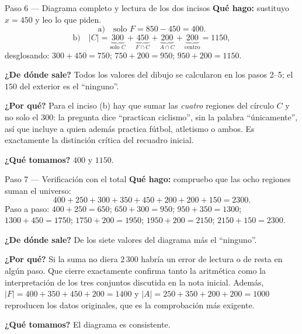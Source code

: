 \documentclass[11pt]{article}
\begin{document}
\begin{paso}{Paso 6 --- Diagrama completo y lectura de los dos incisos}
\textbf{Qué hago:} sustituyo $x=450$ y leo lo que piden.
\[
\text{a)}\quad \text{solo }F = 850-450 = 400 .
\]
\[
\text{b)}\quad |C| = \underbrace{300}_{\text{solo }C}+\underbrace{450}_{F\cap C}+\underbrace{200}_{A\cap C}
+\underbrace{200}_{\text{centro}} = 1150,
\]
desglosando: $300+450=750$; $750+200=950$; $950+200=1150$.

\begin{center}
\end{center}

\textbf{¿De dónde sale?} Todos los valores del dibujo se calcularon en los pasos 2--5; el $150$ del
exterior es el ``ninguno''.

\textbf{¿Por qué?} Para el inciso (b) hay que sumar las \emph{cuatro} regiones del círculo $C$ y no solo
el $300$: la pregunta dice ``practican ciclismo'', sin la palabra ``únicamente'', así que incluye a quien
además practica fútbol, atletismo o ambos. Es exactamente la distinción crítica del recuadro inicial.

\textbf{¿Qué tomamos?} $400$ y $1150$.
\end{paso}

\begin{paso}{Paso 7 --- Verificación con el total}
\textbf{Qué hago:} compruebo que las ocho regiones suman el universo:
\[
400+250+300+350+450+200+200+150 = 2300 .
\]
Paso a paso: $400+250=650$; $650+300=950$; $950+350=1300$; $1300+450=1750$; $1750+200=1950$;
$1950+200=2150$; $2150+150=2300$.

\textbf{¿De dónde sale?} De los siete valores del diagrama más el ``ninguno''.

\textbf{¿Por qué?} Si la suma no diera $2\,300$ habría un error de lectura o de resta en algún paso. Que
cierre exactamente confirma tanto la aritmética como la interpretación de los tres conjuntos discutida en
la nota inicial. Además, $|F|=400+350+450+200=1400$ y $|A|=250+350+200+200=1000$ reproducen los datos
originales, que es la comprobación más exigente.

\textbf{¿Qué tomamos?} El diagrama es consistente.
\end{paso}
\end{document}
